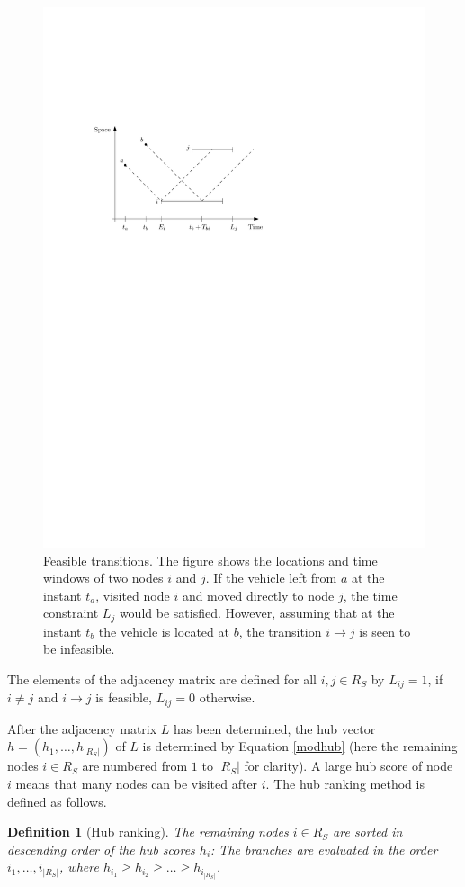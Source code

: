 \documentclass[dissertation,draft*]{aaltoseries}
\newtheorem*{definition}{Definition}
\begin{document}
\begin{figure}[ht]
\begin{center}
\includegraphics[width=0.7\columnwidth]{transitions01.pdf}
\caption{Feasible transitions. The figure shows the 
locations and time windows of two nodes $i$ and $j$.
If the vehicle left from $a$ at the instant $t_a$, visited node $i$
and moved directly to node $j$, the time constraint $L_j$ would be satisfied. 
However, assuming that at the instant $t_b$ the vehicle is located at $b$, the
transition $i \to j$ is seen to be infeasible.
}
\label{transitions01}
\end{center}
\end{figure}
The elements of the adjacency matrix are defined for all $i,j \in R_S$ by 
$L_{ij}= 1$, if $i \neq j$ and $i \to j$ is feasible, $L_{ij} = 0$ otherwise.

After the adjacency matrix $L$ has been determined, the hub vector $h=(h_1,\ldots,h_{|R_S|})$ of $L$ is determined by 
Equation \eqref{modhub} (here the remaining nodes $i \in R_S$ are numbered from $1$ to $|R_S|$ for clarity). 
A large hub score of node $i$ means that many 
nodes can be visited after $i$. 
The hub ranking method is defined as follows.
\begin{definition}[Hub ranking]
The remaining nodes $i \in R_S$ are sorted in descending order of the hub scores $h_i$: 
The branches are evaluated in the order $i_1,\ldots,i_{|R_S|}$, where
$h_{i_1} \geq h_{i_2} \geq \ldots \geq h_{i_{|R_S|}}$.
\end{definition}
\end{document}
